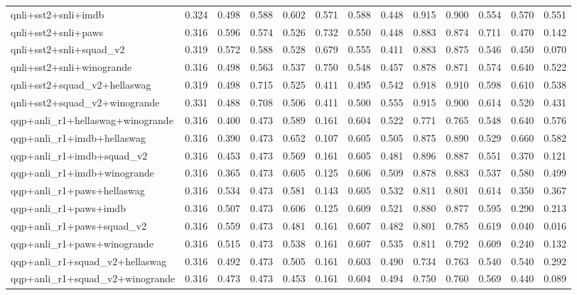 \begin{table}[t]
\begin{tabular}{lrrrrrrrrrrrr}
    qnli+sst2+snli+imdb & 0.324 & 0.498 & 0.588 & 0.602 & 0.571 & 0.588 & 0.448 & 0.915 & 0.900 & 0.554 & 0.570 & 0.551 \\
    qnli+sst2+snli+paws & 0.316 & 0.596 & 0.574 & 0.526 & 0.732 & 0.550 & 0.448 & 0.883 & 0.874 & 0.711 & 0.470 & 0.142 \\
    qnli+sst2+snli+squad\_v2 & 0.319 & 0.572 & 0.588 & 0.528 & 0.679 & 0.555 & 0.411 & 0.883 & 0.875 & 0.546 & 0.450 & 0.070 \\
    qnli+sst2+snli+winogrande & 0.316 & 0.498 & 0.563 & 0.537 & 0.750 & 0.548 & 0.457 & 0.878 & 0.871 & 0.574 & 0.640 & 0.522 \\
    qnli+sst2+squad\_v2+hellaswag & 0.319 & 0.498 & 0.715 & 0.525 & 0.411 & 0.495 & 0.542 & 0.918 & 0.910 & 0.598 & 0.610 & 0.538 \\
    qnli+sst2+squad\_v2+winogrande & 0.331 & 0.488 & 0.708 & 0.506 & 0.411 & 0.500 & 0.555 & 0.915 & 0.900 & 0.614 & 0.520 & 0.431 \\
    qqp+anli\_r1+hellaswag+winogrande & 0.316 & 0.400 & 0.473 & 0.589 & 0.161 & 0.604 & 0.522 & 0.771 & 0.765 & 0.548 & 0.640 & 0.576 \\
    qqp+anli\_r1+imdb+hellaswag & 0.316 & 0.390 & 0.473 & 0.652 & 0.107 & 0.605 & 0.505 & 0.875 & 0.890 & 0.529 & 0.660 & 0.582 \\
    qqp+anli\_r1+imdb+squad\_v2 & 0.316 & 0.453 & 0.473 & 0.569 & 0.161 & 0.605 & 0.481 & 0.896 & 0.887 & 0.551 & 0.370 & 0.121 \\
    qqp+anli\_r1+imdb+winogrande & 0.316 & 0.365 & 0.473 & 0.605 & 0.125 & 0.606 & 0.509 & 0.878 & 0.883 & 0.537 & 0.580 & 0.499 \\
    qqp+anli\_r1+paws+hellaswag & 0.316 & 0.534 & 0.473 & 0.581 & 0.143 & 0.605 & 0.532 & 0.811 & 0.801 & 0.614 & 0.350 & 0.367 \\
    qqp+anli\_r1+paws+imdb & 0.316 & 0.507 & 0.473 & 0.606 & 0.125 & 0.609 & 0.521 & 0.880 & 0.877 & 0.595 & 0.290 & 0.213 \\
    qqp+anli\_r1+paws+squad\_v2 & 0.316 & 0.559 & 0.473 & 0.481 & 0.161 & 0.607 & 0.482 & 0.801 & 0.785 & 0.619 & 0.040 & 0.016 \\
    qqp+anli\_r1+paws+winogrande & 0.316 & 0.515 & 0.473 & 0.538 & 0.161 & 0.607 & 0.535 & 0.811 & 0.792 & 0.609 & 0.240 & 0.132 \\
    qqp+anli\_r1+squad\_v2+hellaswag & 0.316 & 0.492 & 0.473 & 0.505 & 0.161 & 0.603 & 0.490 & 0.734 & 0.763 & 0.540 & 0.540 & 0.292 \\
    qqp+anli\_r1+squad\_v2+winogrande & 0.316 & 0.473 & 0.473 & 0.453 & 0.161 & 0.604 & 0.494 & 0.750 & 0.760 & 0.569 & 0.440 & 0.089 \\

\end{tabular}
\end{table}
